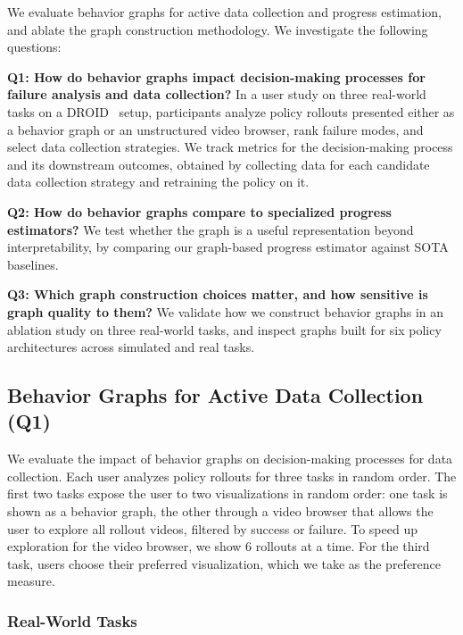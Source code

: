 \documentclass[letterpaper, 10 pt, conference]{ieeeconf}
\begin{document}
We evaluate behavior graphs for active data collection and progress estimation, and ablate the graph construction methodology. We investigate the following questions:

\textbf{Q1: How do behavior graphs impact decision-making processes for failure analysis and data collection?} In a user study on three real-world tasks on a DROID~\cite{khazatsky2024droid} setup, participants analyze policy rollouts presented either as a behavior graph or an unstructured video browser, rank failure modes, and select data collection strategies. 
We track metrics for the decision-making process and its downstream outcomes, obtained by collecting data for each candidate data collection strategy and retraining the policy on it.

\textbf{Q2: How do behavior graphs compare to specialized progress estimators?} We test whether the graph is a useful representation beyond interpretability, by comparing our graph-based progress estimator against SOTA baselines.

\textbf{Q3: Which graph construction choices matter, and how sensitive is graph quality to them?} We validate how we construct behavior graphs in an ablation study on three real-world tasks, and inspect graphs built for six policy architectures across simulated and real tasks.

\subsection{Behavior Graphs for Active Data Collection (Q1)}
\label{sec:user_study}

We evaluate the impact of behavior graphs on decision-making processes for data collection. Each user analyzes policy rollouts for three tasks in random order. 
The first two tasks expose the user to two visualizations in random order: one task is shown as a behavior graph, the other through a video browser that allows the user to explore all rollout videos, filtered by success or failure. To speed up exploration for the video browser, we show 6 rollouts at a time. 
For the third task, users choose their preferred visualization, which we take as the preference measure.

\subsubsection{Real-World Tasks}
\end{document}
